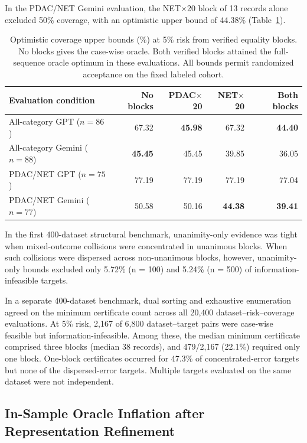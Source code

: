 \documentclass[letterpaper]{article}
\begin{document}
In the PDAC/NET Gemini evaluation, the NET$\times$20 block of 13 records alone excluded 50\% coverage, with an optimistic upper bound of 44.38\% (Table~\ref{tab:2}).

\begin{table}[t]
\centering
\small
\setlength{\tabcolsep}{5pt}
\begin{tabular}{lrrrr}
\toprule
Evaluation condition & No blocks & PDAC$\times$20 & NET$\times$20 & Both blocks \\
\midrule
All-category GPT ($n=86$) & 67.32 & \textbf{45.98} & 67.32 & \textbf{44.40}\\
All-category Gemini ($n=88$) & \textbf{45.45} & 45.45 & 39.85 & 36.05\\
PDAC/NET GPT ($n=75$) & 77.19 & 77.19 & 77.19 & 77.04\\
PDAC/NET Gemini ($n=77$) & 50.58 & 50.16 & \textbf{44.38} & \textbf{39.41}\\
\bottomrule
\end{tabular}
\caption{Optimistic coverage upper bounds (\%) at 5\% risk from verified equality blocks. No blocks gives the case-wise oracle. Both verified blocks attained the full-sequence oracle optimum in these evaluations. All bounds permit randomized acceptance on the fixed labeled cohort.}
\label{tab:2}
\end{table}

In the first 400-dataset structural benchmark, unanimity-only evidence was tight when mixed-outcome collisions were concentrated in unanimous blocks. When such collisions were dispersed across non-unanimous blocks, however, unanimity-only bounds excluded only 5.72\% (n = 100) and 5.24\% (n = 500) of information-infeasible targets.

In a separate 400-dataset benchmark, dual sorting and exhaustive enumeration agreed on the minimum certificate count across all 20,400 dataset--risk--coverage evaluations. At 5\% risk, 2,167 of 6,800 dataset--target pairs were case-wise feasible but information-infeasible. Among these, the median minimum certificate comprised three blocks (median 38 records), and 479/2,167 (22.1\%) required only one block. One-block certificates occurred for 47.3\% of concentrated-error targets but none of the dispersed-error targets. Multiple targets evaluated on the same dataset were not independent.

\subsection{In-Sample Oracle Inflation after Representation Refinement}
\end{document}
